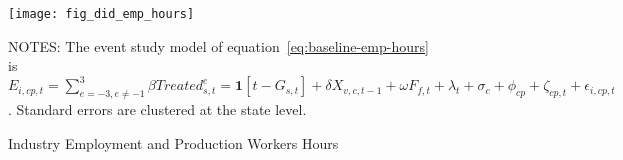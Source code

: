 \begin{figure}[H]
    \centering
    \texttt{[image: fig\_did\_emp\_hours]}
    \caption{Industry Employment and Production Workers Hours}
    \label{fig:baseline-employment-hours}
    \begin{minipage}{18cm}
        \vspace{0.05in}
        NOTES: The event study model of equation~\ref{eq:baseline-emp-hours} is $E_{i,cp,t} = \sum_{{e = -3},{e \neq -1}}^{3} \beta Treated_{s,t}^e = \textbf{1}[t - G_{s,t}] + \delta X_{v,c,t-1} + \omega F_{f,t} + \lambda_{t} + \sigma_{c} + \phi_{cp} + \zeta_{cp,t} + \epsilon_{i,cp,t}$. Standard errors are clustered at the state level.
    \end{minipage}
\end{figure}